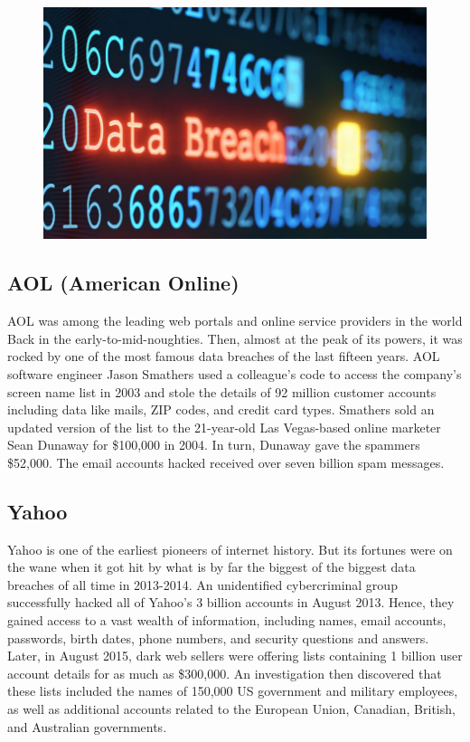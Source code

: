 \documentclass[12pt,a4paper,conference]{IEEEtran}
\begin{document}
\begin{figure}[h!]
  \includegraphics[width=\linewidth]{hack.jpg}
\end{figure}

\subsection{AOL (American Online)}
AOL was among the leading web portals and online service providers in the world Back in the early-to-mid-noughties. Then, almost at the peak of its powers, it was rocked by one of the most famous data breaches of the last fifteen years. AOL software engineer Jason Smathers used a colleague’s code to access the company’s screen name list in 2003 and stole the details of 92 million customer accounts including data like mails, ZIP codes, and credit card types. Smathers sold an updated version of the list to the 21-year-old Las Vegas-based online marketer Sean Dunaway for \$100,000 in 2004. In turn, Dunaway gave the spammers \$52,000. The email accounts hacked received over seven billion spam messages. \autocite{Breaches18}

\subsection{Yahoo}
Yahoo is one of the earliest pioneers of internet history. But its fortunes were on the wane when it got hit by what is by far the biggest of the biggest data breaches of all time in 2013-2014. An unidentified cybercriminal group successfully hacked all of Yahoo’s 3 billion accounts in August 2013. Hence, they gained access to a vast wealth of information, including names, email accounts, passwords, birth dates, phone numbers, and security questions and answers. Later, in August 2015, dark web sellers were offering lists containing 1 billion user account details for as much as \$300,000. An investigation then discovered that these lists included the names of 150,000 US government and military employees, as well as additional accounts related to the European Union, Canadian, British, and Australian governments.
\end{document}
